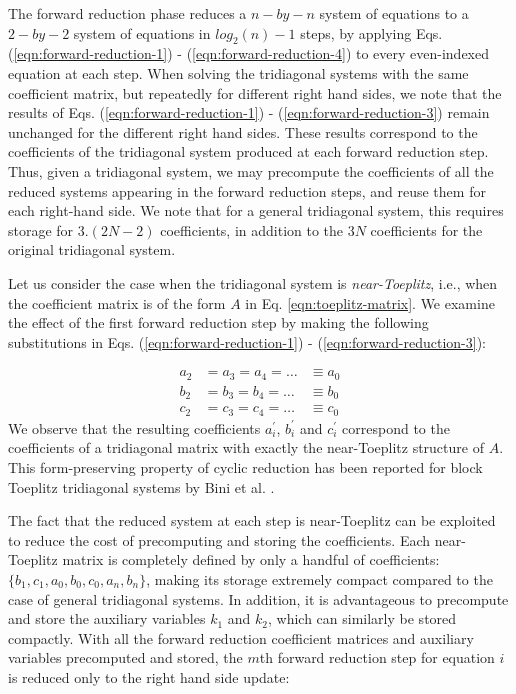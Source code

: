The forward reduction phase reduces
a $n-by-n$ system of equations to a
$2-by-2$ system of equations in $log_2(n)-1$ steps,
by applying
Eqs. (\ref{eqn:forward-reduction-1}) -
(\ref{eqn:forward-reduction-4})
to every even-indexed equation at each step.
When solving the tridiagonal systems
with the same coefficient matrix,
but repeatedly for different right hand sides,
we note that the results of
Eqs. (\ref{eqn:forward-reduction-1}) -
(\ref{eqn:forward-reduction-3})
remain unchanged for the different right hand sides.
These results correspond to the
coefficients of the tridiagonal system
produced at each forward reduction step.
Thus, given a tridiagonal system,
we may precompute
the coefficients of all
the reduced systems appearing in the
forward reduction steps,
and reuse them for each right-hand side.
We note that for a general tridiagonal system,
this requires storage for $3.(2N - 2)$ coefficients,
in addition to the $3N$ coefficients
for the original tridiagonal system.

Let us consider the case
when the tridiagonal system is \emph{near-Toeplitz},
i.e., when the coefficient matrix is of the form
$A$ in Eq. \ref{eqn:toeplitz-matrix}.
We examine the effect of the
first forward reduction step by making the following substitutions
in Eqs. (\ref{eqn:forward-reduction-1}) -
(\ref{eqn:forward-reduction-3}):

\begin{align*}
    a_2 &= a_3 = a_4 = \hdots &\equiv a_0 \\
    b_2 &= b_3 = b_4 = \hdots &\equiv b_0 \\
    c_2 &= c_3 = c_4 = \hdots &\equiv c_0
\end{align*}
%
We observe that the resulting coefficients
$a_i^\prime$, $b_i^\prime$ and $c_i^\prime$
correspond to the coefficients of a tridiagonal matrix with
exactly the near-Toeplitz structure of $A$.
This form-preserving property of cyclic reduction
has been reported for block Toeplitz tridiagonal systems
by Bini et al. \cite{bini}.

The fact that the reduced system at each step
is near-Toeplitz can be exploited
to reduce the cost of
precomputing and storing the coefficients.
Each near-Toeplitz matrix is completely defined
by only a handful of coefficients:
$\{b_1, c_1, a_0, b_0, c_0, a_n, b_n\}$,
making its storage extremely compact
compared to the case of general tridiagonal systems.
In addition,
it is advantageous to precompute and store the
auxiliary variables $k_1$ and $k_2$,
which can similarly be stored compactly.
With all the forward reduction coefficient matrices
and auxiliary variables precomputed and stored,
the $m$th forward reduction step for equation $i$
is reduced only to the right hand side update:

